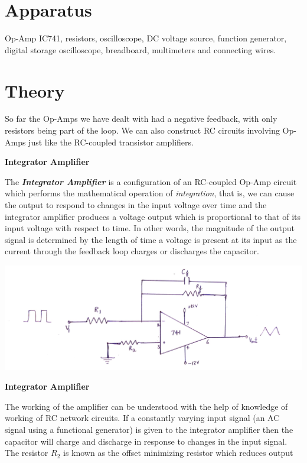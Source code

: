 \section{Apparatus}
\noindent Op-Amp IC741, resistors, oscilloscope, DC voltage source, function generator, digital storage oscilloscope, breadboard, multimeters and connecting wires.
\section{Theory}
\noindent So far the Op-Amps we have dealt with had a negative feedback, with only resistors being part of the loop. We can also construct RC circuits involving Op-Amps just like the RC-coupled transistor amplifiers.
\par
\begin{center}
    \textbf{\large Integrator Amplifier}
\end{center}
\noindent The \textbf{\emph{Integrator Amplifier}} is a configuration of an RC-coupled Op-Amp circuit which performs the mathematical operation of \emph{integration}, that is, we can cause the output to respond to changes in the input voltage over time and the integrator amplifier produces a voltage output which is proportional to that of its input voltage with respect to time. In other words, the magnitude of the output signal is determined by the length of time a voltage is present at its input as the current through the feedback loop charges or discharges the capacitor.
\begin{center}
    \includegraphics[scale = 0.21]{Documents/intcir.jpg}
\end{center}
\begin{center}
    \textbf{Integrator Amplifier}
\end{center}
\noindent The working of the amplifier can be understood with the help of knowledge of working of RC network circuits. If a constantly varying input signal (an AC signal using a functional generator) is given to the integrator amplifier then the capacitor will charge and discharge in response to changes in the input signal. The resistor $R_2$ is known as the offset minimizing resistor which reduces output
